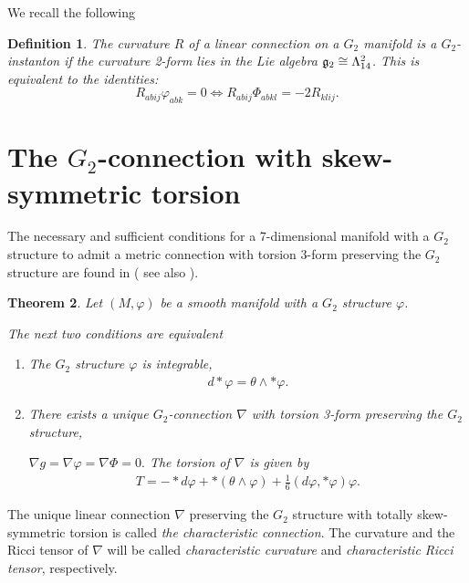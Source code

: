 \documentclass[10pt,british]{article}
\newtheorem{thrm}{Theorem}[section]
\newtheorem{dfn}[thrm]{Definition}
\def\sb {{\nabla}}
\def\p{{\varphi}}
\def\ph{{\Phi}}
\begin{document}
We recall the following
\begin{dfn}
The curvature $R$ of a linear connection on a $G_2$ manifold  is a $G_2$-instanton if  the curvature 2-form lies in the Lie algebra $\frak{g}_2\cong\Lambda^2_{14}$. This is equivalent to  the  identities:
\begin{equation}\label{rri}
R_{abij}\p_{abk}=0 \Longleftrightarrow R_{abij}\ph_{abkl}=-2R_{klij}.
\end{equation}
\end{dfn}
\section{The $G_2$-connection with skew-symmetric torsion}
The necessary and sufficient  conditions for  a 7-dimensional manifold with a $G_2$ structure to admit a metric connection with torsion 3-form preserving the $G_2$ structure are found in \cite{FI} ( see also \cite{GKMW,FI1,GMW,GMPW}). %
\begin{thrm}\cite[Theorem~4.8]{FI}\label{cythm1}
Let $(M,\p)$ be a  smooth  manifold with a $G_2$ structure $\p$.

The next two conditions are equivalent
\begin{enumerate}
\item[a)] The $G_2$ structure $\p$ is integrable,
\begin{equation}\label{cycon}
\begin{split}
d*\p=\theta\wedge *\p.
\end{split}
\end{equation}
\item[b)] There exists a unique $G_2$-connection $\sb$ with torsion 3-form preserving the $G_2$ structure,

$%
\sb g=\sb\p=\sb\ph=0.
$%
The torsion of $\sb$ is given by
\begin{equation}\label{torcy}
\begin{split}
T=-*d\p +*(\theta\wedge\p)+\frac{1}{6}(d\p,*\p)\p.
\end{split}
\end{equation}
\end{enumerate}
\end{thrm}
The unique linear connection $\sb$  preserving the $G_2$ structure with totally skew-symmetric torsion is called \emph{the characteristic connection}.  The curvature and the Ricci tensor of $\sb$  will be called \emph{characteristic curvature} and \emph{characteristic Ricci tensor}, respectively.
\end{document}

